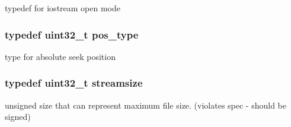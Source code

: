 typedef for iostream open mode \hypertarget{classios__base_a0833e9c1b028d7389a319a3dd11290d3}{
\subsubsection[{pos\-\_\-type}]{\setlength{\rightskip}{0pt plus 5cm}typedef uint32\-\_\-t {\bf pos\-\_\-type}}}\label{classios__base_a0833e9c1b028d7389a319a3dd11290d3}
type for absolute seek position \hypertarget{classios__base_a4da0480b3f0f665fd27870782a6f7331}{
\subsubsection[{streamsize}]{\setlength{\rightskip}{0pt plus 5cm}typedef uint32\-\_\-t {\bf streamsize}}}\label{classios__base_a4da0480b3f0f665fd27870782a6f7331}
unsigned size that can represent maximum file size. (violates spec -\/ should be signed) 

